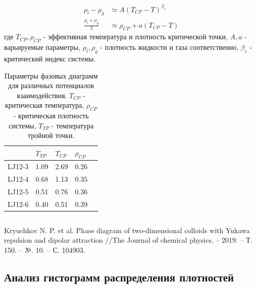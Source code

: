 \documentclass[pdf,hyperref={unicode}]{beamer}
\begin{document}
\begin{frame}
\begin{columns}
\begin{column}{0.5\linewidth}
{\tiny{
\begin{equation}
\begin{aligned}
\rho_l - \rho_g &\simeq A (T_{CP} - T)^{\beta_c} \\
\frac{\rho_l + \rho_g}{2} &\simeq \rho_{CP} + a(T_{CP} - T)
\end{aligned}
\label{eqFitFhase}
\end{equation}
где $T_{CP}, \rho_{CP}$ - эффективная температура и плотность критической точки, $A, a$ - варьируемые параметры, $\rho_l, \rho_g$ - плотность жидкости и газа соответственно, $\beta_c$ - критический индекс системы.
}}
{
\tiny{
\begin{table}[h]
\begin{tabular}{| l | l | l | l | l |}
\hline
    & $T_{TP}$  & $T_{CP}$  & $\rho_{CP}$   \\ \hline
LJ12-3  & 1.09  &  2.69   &  0.26   \\ \hline
LJ12-4  & 0.68  & 1.13    & 0.35    \\ \hline
LJ12-5  & 0.51  &  0.76   &  0.36   \\ \hline
LJ12-6  & 0.40  &  0.51   &  0.39   \\ \hline
\end{tabular}
\caption{\tiny Параметры фазовых диаграмм для различных потенциалов взаимодействия. $T_{CP}$ - критическая температура, $\rho_{CP}$ - критическая плотность системы, $T_{TP}$ - температура тройной точки.}
\label{tablSystemConst}
\end{table}
}
}
\end{column}

\end{columns}
\vspace{2mm}
\tiny{
Kryuchkov N. P. et al. Phase diagram of two-dimensional colloids with Yukawa repulsion and dipolar attraction //The Journal of chemical physics. – 2019. – Т. 150. – №. 10. – С. 104903.
}
\end{frame}




\subsection{Анализ гистограмм распределения плотностей}
\end{document}
